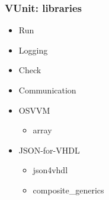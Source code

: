 \documentclass[xcolor={usenames,dvipsnames,svgnames}]{beamer}
\begin{document}
\begin{frame}
\frametitle{VUnit: libraries}
\begin{itemize}
  \item Run
  \href{http://vunit.github.io/run/user_guide.html}{\faBook}
  \href{https://github.com/VUnit/vunit/tree/master/examples/vhdl/run}{\faCode}

  \vfill

  \item Logging
  \href{http://vunit.github.io/logging/user_guide.html}{\faBook}
  \href{https://github.com/VUnit/vunit/tree/master/examples/vhdl/logging}{\faCode}

  \vfill

  \item Check
  \href{http://vunit.github.io/check/user_guide.html}{\faBook}
  \href{https://github.com/VUnit/vunit/tree/master/examples/vhdl/check}{\faCode}

  \vfill

  \item Communication
  \href{http://vunit.github.io/com/user_guide.html}{\faBook}
  \href{https://github.com/VUnit/vunit/tree/master/examples/vhdl/com/}{\faCode}

  \vfill

  \item OSVVM
  \begin{itemize}
    \item array
    \href{https://github.com/VUnit/vunit/tree/master/examples/vhdl/array}{\faCode}
  \end{itemize}

  \vfill

  \item JSON-for-VHDL
  \begin{itemize}
    \item json4vhdl
    \href{https://github.com/VUnit/vunit/tree/master/examples/vhdl/json4vhdl}{\faCode}
    \item composite\_generics
    \href{https://github.com/VUnit/vunit/tree/master/examples/vhdl/composite_generics}{\faCode}
  \end{itemize}
\end{itemize}
\vfill
\end{frame}
\end{document}
